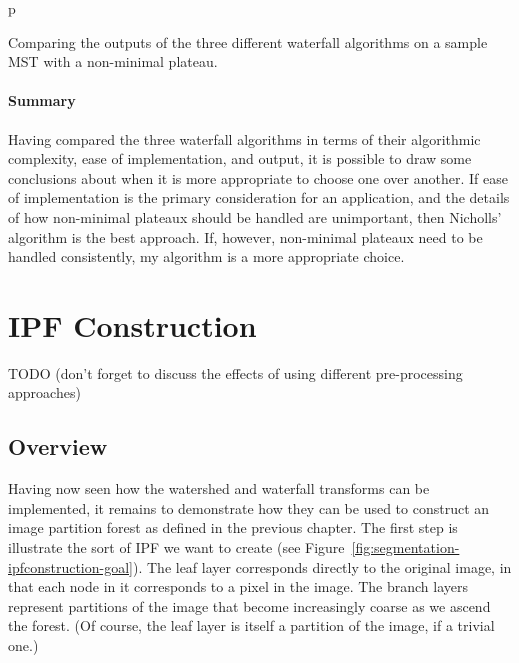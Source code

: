 \begin{stusubfig}{p}
	\hspace{4mm}%
\caption{Comparing the outputs of the three different waterfall algorithms on a sample MST with a non-minimal plateau.}
\label{fig:segmentation-waterfall-comparison}
\end{stusubfig}

\paragraph{Summary}

Having compared the three waterfall algorithms in terms of their algorithmic complexity, ease of implementation, and output, it is possible to draw some conclusions about when it is more appropriate to choose one over another. If ease of implementation is the primary consideration for an application, and the details of how non-minimal plateaux should be handled are unimportant, then Nicholls' algorithm is the best approach. If, however, non-minimal plateaux need to be handled consistently, my algorithm is a more appropriate choice.

\section{IPF Construction}
\label{sec:segmentation-ipfconstruction}

TODO (don't forget to discuss the effects of using different pre-processing approaches)

\subsection{Overview}

Having now seen how the watershed and waterfall transforms can be implemented, it remains to demonstrate how they can be used to construct an image partition forest as defined in the previous chapter. The first step is illustrate the sort of IPF we want to create (see Figure~\ref{fig:segmentation-ipfconstruction-goal}). The leaf layer corresponds directly to the original image, in that each node in it corresponds to a pixel in the image. The branch layers represent partitions of the image that become increasingly coarse as we ascend the forest. (Of course, the leaf layer is itself a partition of the image, if a trivial one.)

